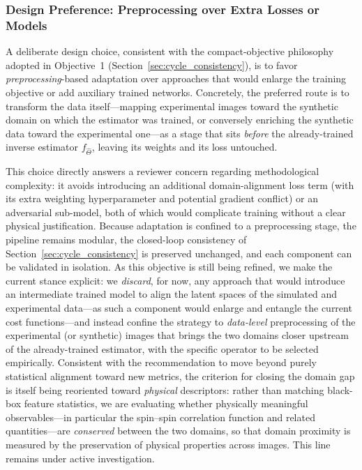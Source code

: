 \documentclass[letterpaper, 12, one column]{article}
\begin{document}
{\color[rgb]{0,0,1}\subsubsection{Design Preference: Preprocessing over Extra Losses or Models}

A deliberate design choice, consistent with the compact-objective philosophy adopted in Objective~1 (Section~\ref{sec:cycle_consistency}), is to favor \emph{preprocessing}-based adaptation over approaches that would enlarge the training objective or add auxiliary trained networks. Concretely, the preferred route is to transform the data itself---mapping experimental images toward the synthetic domain on which the estimator was trained, or conversely enriching the synthetic data toward the experimental one---as a stage that sits \emph{before} the already-trained inverse estimator $f_{\hat{\Theta}}$, leaving its weights and its loss untouched.

This choice directly answers a reviewer concern regarding methodological complexity: it avoids introducing an additional domain-alignment loss term (with its extra weighting hyperparameter and potential gradient conflict) or an adversarial sub-model, both of which would complicate training without a clear physical justification. Because adaptation is confined to a preprocessing stage, the pipeline remains modular, the closed-loop consistency of Section~\ref{sec:cycle_consistency} is preserved unchanged, and each component can be validated in isolation. As this objective is still being refined, we make the current stance explicit: we \emph{discard}, for now, any approach that would introduce an intermediate trained model to align the latent spaces of the simulated and experimental data---as such a component would enlarge and entangle the current cost functions---and instead confine the strategy to \emph{data-level} preprocessing of the experimental (or synthetic) images that brings the two domains closer upstream of the already-trained estimator, with the specific operator to be selected empirically. Consistent with the recommendation to move beyond purely statistical alignment toward new metrics, the criterion for closing the domain gap is itself being reoriented toward \emph{physical} descriptors: rather than matching black-box feature statistics, we are evaluating whether physically meaningful observables---in particular the spin--spin correlation function and related quantities---are \emph{conserved} between the two domains, so that domain proximity is measured by the preservation of physical properties across images. This line remains under active investigation.

}
\end{document}
